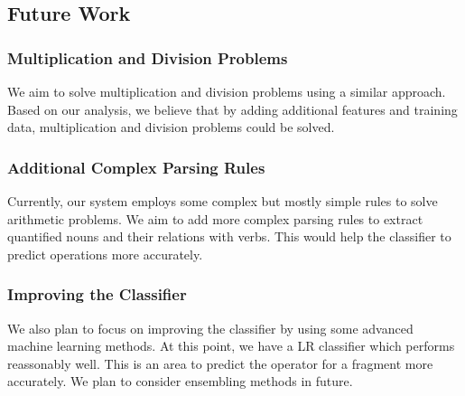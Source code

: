\documentclass[11pt]{article}
\begin{document}
\subsection{Future Work}\label{sec:futurework}
\subsubsection{Multiplication and Division Problems}\label{sec:futureworkmanddproblems}
We aim to solve multiplication and division problems using a similar approach. Based on our analysis, we believe that by adding additional features and training data, multiplication and division problems could be solved.

\subsubsection{Additional Complex Parsing Rules}\label{sec:futureworkparsingrules}
Currently, our system employs some complex but mostly simple rules to solve arithmetic problems. We aim to add more complex parsing rules to extract quantified nouns and their relations with verbs. This would help the classifier to predict operations more accurately. 

\subsubsection{Improving the Classifier}\label{sec:classifierimprovement}
We also plan to focus on improving the classifier by using some advanced machine learning methods. At this point, we have a LR classifier which performs reassonably well. This is an area to predict the operator for a fragment more accurately. We plan to consider ensembling methods in future.

\newpage
\end{document}
